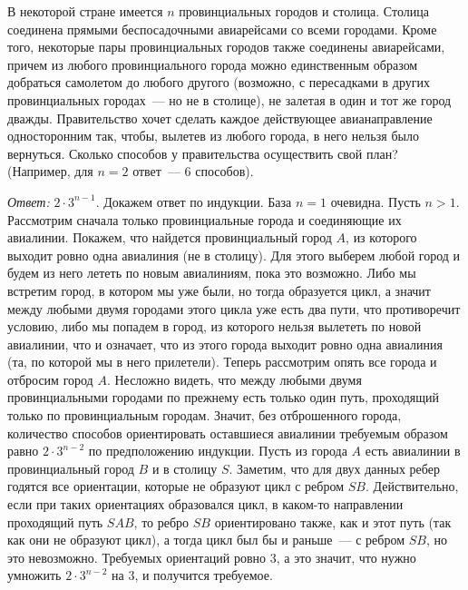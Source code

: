 В некоторой стране имеется $n$ провинциальных городов и столица.
Столица соединена прямыми беспосадочными авиарейсами со всеми городами.
Кроме того, некоторые пары провинциальных городов также соединены авиарейсами,
причем из любого провинциального города можно единственным образом добраться
самолетом до любого другого
(возможно, с пересадками в других провинциальных городах~--- но не в столице),
не залетая в один и тот же город дважды.
Правительство хочет сделать каждое действующее авианаправление односторонним
так, чтобы, вылетев из любого города, в него нельзя было вернуться.
Сколько способов у правительства осуществить свой план?
(Например, для $n = 2$ ответ~--- $6$ способов).

\solution
\emph{Ответ:} $2 \cdot 3^{n-1}$.
Докажем ответ по индукции.
База $n = 1$ очевидна.
Пусть $n > 1$.
Рассмотрим сначала только провинциальные города и соединяющие их авиалинии.
Покажем, что найдется провинциальный город $A$, из которого выходит ровно одна
авиалиния (не в столицу).
Для этого выберем любой город и будем из него лететь по новым авиалиниям, пока
это возможно.
Либо мы встретим город, в котором мы уже были, но тогда образуется цикл, а
значит между любыми двумя городами этого цикла уже есть два пути, что
противоречит условию, либо мы попадем в город, из которого нельзя вылететь по
новой авиалинии, что и означает, что из этого города выходит ровно одна
авиалиния (та, по которой мы в него прилетели).
Теперь рассмотрим опять все города и отбросим город $A$.
Несложно видеть, что между любыми двумя провинциальными городами по прежнему
есть только один путь, проходящий только по провинциальным городам.
Значит, без отброшенного города, количество способов ориентировать оставшиеся
авиалинии требуемым образом равно $2 \cdot 3^{n-2}$ по предположению индукции.
Пусть из города $A$ есть авиалинии в провинциальный город $B$ и в столицу $S$.
Заметим, что для двух данных ребер годятся все ориентации, которые не образуют
цикл с ребром $SB$.
Действительно, если при таких ориентациях образовался цикл, в каком-то
направлении проходящий путь $SAB$, то ребро $SB$ ориентировано также, как и
этот путь (так как они не образуют цикл), а тогда цикл был бы и раньше~---
с ребром $SB$, но это невозможно.
Требуемых ориентаций ровно 3, а это значит, что нужно умножить
$2 \cdot 3^{n-2}$ на 3, и получится требуемое. 

